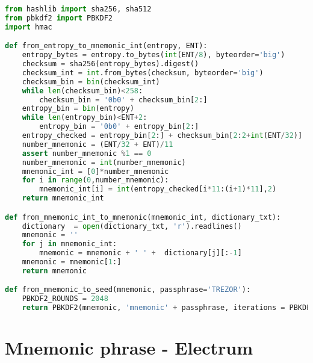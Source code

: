 \begin{lstlisting}[language=Python]
from hashlib import sha256, sha512
from pbkdf2 import PBKDF2
import hmac

def from_entropy_to_mnemonic_int(entropy, ENT):  
	entropy_bytes = entropy.to_bytes(int(ENT/8), byteorder='big')
	checksum = sha256(entropy_bytes).digest()
	checksum_int = int.from_bytes(checksum, byteorder='big')
	checksum_bin = bin(checksum_int)
	while len(checksum_bin)<258:
		checksum_bin = '0b0' + checksum_bin[2:]
	entropy_bin = bin(entropy)
	while len(entropy_bin)<ENT+2:
		entropy_bin = '0b0' + entropy_bin[2:]
	entropy_checked = entropy_bin[2:] + checksum_bin[2:2+int(ENT/32)]
	number_mnemonic = (ENT/32 + ENT)/11
	assert number_mnemonic %1 == 0
	number_mnemonic = int(number_mnemonic)
	mnemonic_int = [0]*number_mnemonic
	for i in range(0,number_mnemonic):
		mnemonic_int[i] = int(entropy_checked[i*11:(i+1)*11],2)
	return mnemonic_int

def from_mnemonic_int_to_mnemonic(mnemonic_int, dictionary_txt):
	dictionary  = open(dictionary_txt, 'r').readlines()
	mnemonic = ''
	for j in mnemonic_int:
		mnemonic = mnemonic + ' ' +  dictionary[j][:-1]
	mnemonic = mnemonic[1:]
	return mnemonic

def from_mnemonic_to_seed(mnemonic, passphrase='TREZOR'):
	PBKDF2_ROUNDS = 2048
	return PBKDF2(mnemonic, 'mnemonic' + passphrase, iterations = PBKDF2_ROUNDS, macmodule = hmac, digestmodule = sha512).read(64).hex())
\end{lstlisting}


\section{Mnemonic phrase - Electrum}

